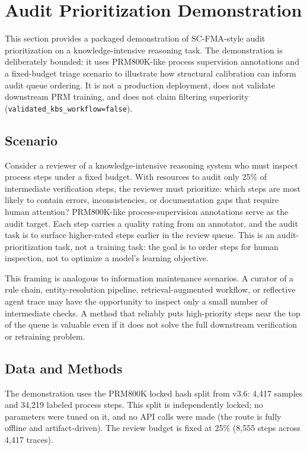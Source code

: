\documentclass[a4paper,fleqn]{cas-sc}
\begin{document}
\section{Audit Prioritization Demonstration}
\label{sec:kbs-audit-demo}

This section provides a packaged demonstration of SC-FMA-style audit prioritization on a knowledge-intensive reasoning task. The demonstration is deliberately bounded: it uses PRM800K-like process supervision annotations and a fixed-budget triage scenario to illustrate how structural calibration can inform audit queue ordering. It is not a production deployment, does not validate downstream PRM training, and does not claim filtering superiority (\texttt{validated\_kbs\_workflow=false}).

\subsection{Scenario}
\label{sec:audit-scenario}

Consider a reviewer of a knowledge-intensive reasoning system who must inspect process steps under a fixed budget. With resources to audit only 25\% of intermediate verification steps, the reviewer must prioritize: which steps are most likely to contain errors, inconsistencies, or documentation gaps that require human attention? PRM800K-like process-supervision annotations serve as the audit target. Each step carries a quality rating from an annotator, and the audit task is to surface higher-rated steps earlier in the review queue. This is an audit-prioritization task, not a training task: the goal is to order steps for human inspection, not to optimize a model's learning objective.

This framing is analogous to information maintenance scenarios. A curator of a rule chain, entity-resolution pipeline, retrieval-augmented workflow, or reflective agent trace may have the opportunity to inspect only a small number of intermediate checks. A method that reliably puts high-priority steps near the top of the queue is valuable even if it does not solve the full downstream verification or retraining problem.

\subsection{Data and Methods}
\label{sec:audit-data-methods}

The demonstration uses the PRM800K locked hash split from v3.6: 4,417 samples and 34,219 labeled process steps. This split is independently locked; no parameters were tuned on it, and no API calls were made (the route is fully offline and artifact-driven). The review budget is fixed at 25\% (8,555 steps across 4,417 traces).
\end{document}
